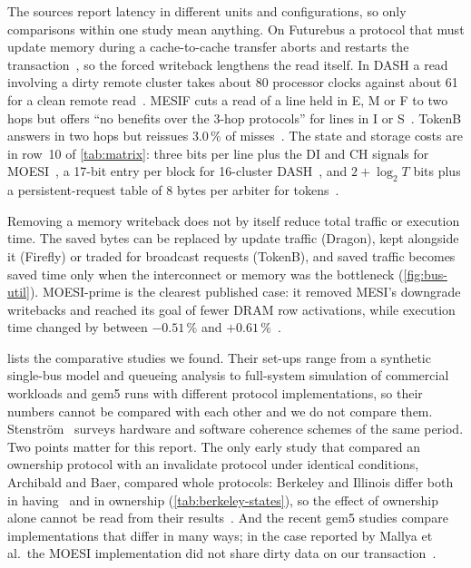 The sources report latency in different units and configurations, so only
comparisons within one study mean anything. On Futurebus a protocol that must
update memory during a cache-to-cache transfer aborts and restarts the
transaction~\cite[p.~418]{sweazey1986moesi}, so the forced writeback lengthens the
read itself. In DASH a read involving a dirty remote cluster takes about 80
processor clocks against about 61 for a clean remote
read~\cite[\S4.2, Fig.~6]{lenoski1990dash}. MESIF cuts a read of a line held in E, M
or F to two hops but offers ``no benefits over the 3-hop protocols'' for lines in I
or S~\cite[\S3]{goodman2009mesif}. TokenB answers in two hops but reissues 3.0\,\%
of misses~\cite[\S6]{martin2003token}. The state and storage costs are in row~10 of
\cref{tab:matrix}: three bits per line plus the \textsc{DI} and \textsc{CH} signals
for MOESI~\cite[p.~416]{sweazey1986moesi}, a 17-bit entry per block for 16-cluster
DASH~\cite[\S3]{lenoski1990dash}, and $2+\log_2T$ bits plus a persistent-request table of 8 bytes per arbiter
for tokens~\cite[\S3.1--3.2]{martin2003token}.

Removing a memory writeback does not by itself reduce total traffic or execution
time. The saved bytes can be replaced by update traffic (Dragon), kept alongside it
(Firefly) or traded for broadcast requests (TokenB), and saved traffic becomes
saved time only when the interconnect or memory was the bottleneck
(\cref{fig:bus-util}). MOESI-prime is the clearest published case: it removed MESI's
downgrade writebacks and reached its goal of fewer DRAM row activations, while
execution time changed by between $-0.51\,\%$ and
$+0.61\,\%$~\cite{loughlin2022moesiprime}.

 lists the comparative studies we found. Their set-ups range
from a synthetic single-bus model and queueing analysis to full-system simulation of
commercial workloads and gem5 runs with different protocol implementations, so
their numbers cannot be compared with each other and we do not compare them.
Stenstr{\"o}m~\cite{stenstrom1990survey} surveys hardware and software coherence
schemes of the same period. Two points matter for this report. The only early study
that compared an ownership protocol with an invalidate protocol under identical
conditions, Archibald and Baer, compared whole protocols: Berkeley and Illinois
differ both in having \stE\ and in ownership (\cref{tab:berkeley-states}), so the
effect of ownership alone cannot be read from their
results~\cite{archibald1986evaluation}. And the recent gem5 studies compare
implementations that differ in many ways; in the case reported by Mallya et al.\
the MOESI implementation did not share dirty data on our
transaction~\cite{mallya2015simulation}.

